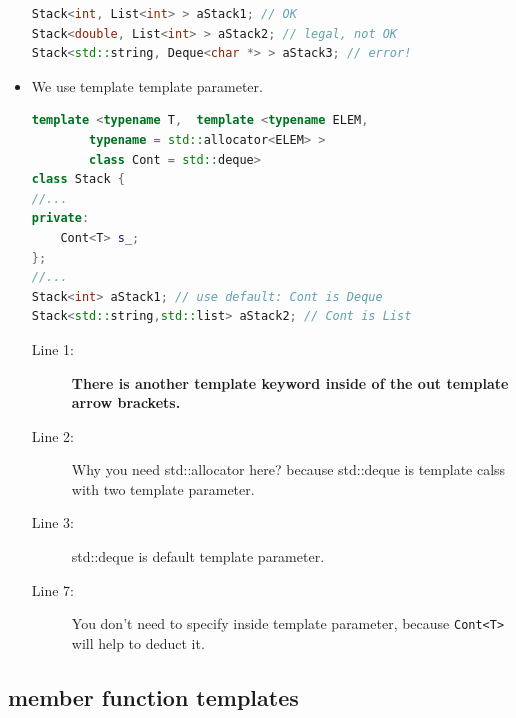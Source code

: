 \documentclass[a4paper,11pt,twoside]{book}
\begin{document}
\begin{itemize}
\begin{lstlisting}[frame=single, language=c++]
Stack<int, List<int> > aStack1; // OK
Stack<double, List<int> > aStack2; // legal, not OK           
Stack<std::string, Deque<char *> > aStack3; // error!   
\end{lstlisting}
    \item We use template template parameter. 

\begin{lstlisting}[frame=single, language=c++]
template <typename T,  template <typename ELEM, 
		typename = std::allocator<ELEM> > 
		class Cont = std::deque>
class Stack {
//...
private:
	Cont<T> s_;
};
//...
Stack<int> aStack1; // use default: Cont is Deque
Stack<std::string,std::list> aStack2; // Cont is List
\end{lstlisting}
\begin{description}
	\item[Line 1:] \textbf{There is another template keyword inside of the out template arrow brackets.} 
	
	\item[Line 2:] Why you need std::allocator here? because std::deque is template calss with two template parameter.
	
	\item[Line 3:] std::deque is default template parameter.
	
	\item[Line 7:] You don't need to specify inside template parameter, because \texttt{Cont<T>} will help to deduct it.
	
\end{description}

\end{itemize}



\subsection{member function templates}
\end{document}
